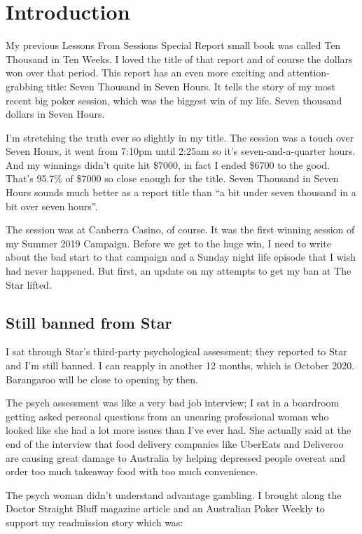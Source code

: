 \chapter{Introduction}


My previous Lessons From Sessions Special Report small book was
called Ten Thousand in Ten Weeks. I loved the title of that
report and of course the dollars won over that period.
This report has an even more exciting and attention-grabbing title: Seven
Thousand in Seven Hours. It tells the story of my most recent big
poker session, which was the biggest win of my life. Seven thousand dollars
in Seven Hours.

I'm stretching the truth ever so slightly in my title. The session was
a touch over Seven Hours, it went from 7:10pm until 2:25am so it's
seven-and-a-quarter hours. And my winnings didn't quite hit \$7000, in
fact I ended \$6700 to the good. That's 95.7\% of \$7000 so close enough
for the title. Seven Thousand in Seven Hours sounds much better as a
report title than ``a bit under seven thousand in a bit over seven
hours''.

The session was at Canberra Casino, of course. It was the first winning
session of my Summer 2019 Campaign. Before we get to the huge win, I
need to write about the bad start to that campaign and a Sunday night
life episode that I wish had never happened. But first, an update on
my attempts to get my ban at The Star lifted.

\section*{Still banned from Star}

I sat through Star's third-party psychological assessment; they
reported to Star and I'm still banned. I can reapply in another 12 months,
which is October 2020. Barangaroo will be close to opening by then.

The psych assessment was like a very bad job interview; I sat in a
boardroom getting asked personal questions from an uncaring
professional woman who looked like she had a lot more issues than I've
ever had. She actually said at the end of the interview that food
delivery companies like UberEats and Deliveroo are causing great
damage to Australia by helping depressed people overeat and order too
much takeaway food with too much convenience.

The psych woman didn't understand advantage gambling. I brought along
the Doctor Straight Bluff magazine article and an Australian Poker
Weekly to support my readmission story which was:

